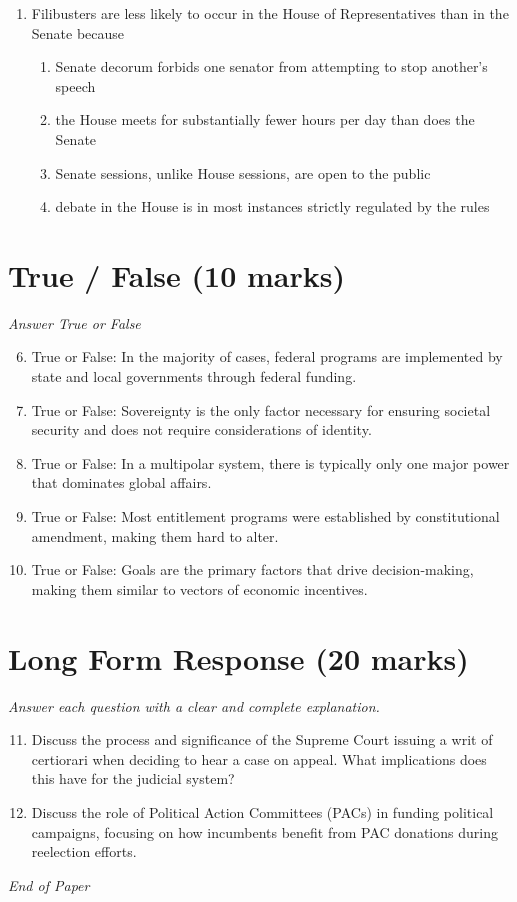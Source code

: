 \documentclass[12pt]{article}
\begin{document}
\begin{enumerate}[label=\arabic*.]
\begin{enumerate}[label=(\alph*)]
    \item Computer experts
    \item Anti-virus industry
    \item Computer networks
\end{enumerate}
\item Filibusters are less likely to occur in the House of Representatives than in the Senate because
\begin{enumerate}[label=(\alph*)]
    \item Senate decorum forbids one senator from attempting to stop another's speech
    \item the House meets for substantially fewer hours per day than does the Senate
    \item Senate sessions, unlike House sessions, are open to the public
    \item debate in the House is in most instances strictly regulated by the rules
\end{enumerate}
\end{enumerate}

\section*{True / False (10 marks)}
\textit{Answer True or False}
\begin{enumerate}[label=\arabic*.]
\setcounter{enumi}{5}
\item True or False: In the majority of cases, federal programs are implemented by state and local governments through federal funding.
\item True or False: Sovereignty is the only factor necessary for ensuring societal security and does not require considerations of identity.
\item True or False: In a multipolar system, there is typically only one major power that dominates global affairs.
\item True or False: Most entitlement programs were established by constitutional amendment, making them hard to alter.
\item True or False: Goals are the primary factors that drive decision-making, making them similar to vectors of economic incentives.
\end{enumerate}

\section*{Long Form Response (20 marks)}
\textit{Answer each question with a clear and complete explanation.}
\begin{enumerate}[label=\arabic*.]
\setcounter{enumi}{10}
\item Discuss the process and significance of the Supreme Court issuing a writ of certiorari when deciding to hear a case on appeal. What implications does this have for the judicial system?
\item Discuss the role of Political Action Committees (PACs) in funding political campaigns, focusing on how incumbents benefit from PAC donations during reelection efforts.
\end{enumerate}

\vfill
\noindent\textit{End of Paper}
\end{document}
